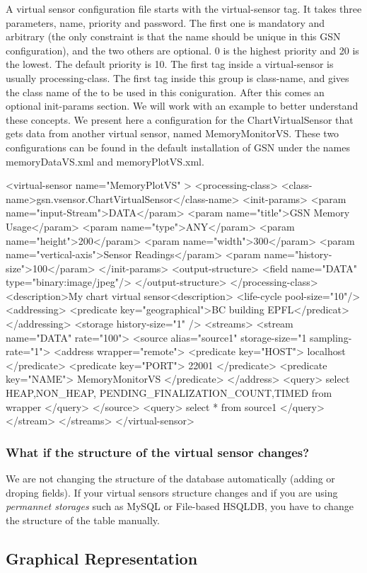 A virtual sensor configuration file starts with the virtual-sensor tag. It takes
three parameters, name, priority and password. The first one is mandatory
and arbitrary (the only constraint is that the name should be unique in this
GSN configuration), and the two others are optional. 0 is the highest priority
and 20 is the lowest. The default priority is 10.
The first tag inside a virtual-sensor is usually processing-class. The first tag
inside this group is class-name, and gives the class name of the \vsp
to be used in this coniguration. After this comes an optional init-params
section.
We will work with an example to better understand these concepts. We
present here a configuration for the ChartVirtualSensor that gets data from
another virtual sensor, named MemoryMonitorVS. These two configurations can
be found in the default installation of GSN under the names memoryDataVS.xml
and memoryPlotVS.xml.

\begin{xmlcode}[caption={\vsd Example}, label=listing:xml:vsd-example]
<virtual-sensor name="MemoryPlotVS" >
	<processing-class>
	<class-name>gsn.vsensor.ChartVirtualSensor</class-name>
		<init-params>
			<param name="input-Stream">DATA</param>
			<param name="title">GSN Memory Usage</param>
			<param name="type">ANY</param>
			<param name="height">200</param>
			<param name="width">300</param>
			<param name="vertical-axis">Sensor Readings</param>
			<param name="history-size">100</param>
		</init-params>
		<output-structure>
			<field name="DATA" type="binary:image/jpeg"/>
		</output-structure>
	</processing-class>
	<description>My chart virtual sensor<description>
	<life-cycle pool-size="10"/>
	<addressing>
		<predicate key="geographical">BC building EPFL</predicat>
	</addressing>
	<storage history-size="1" />
	<streams>
		<stream name="DATA" rate="100">
			<source alias="source1" storage-size="1 sampling-rate="1">
				<address wrapper="remote">
					<predicate key="HOST"> localhost </predicate>
					<predicate key="PORT"> 22001  </predicate>
					<predicate key="NAME">  MemoryMonitorVS  </predicate>
				</address>
				<query>
					select HEAP,NON_HEAP,
					PENDING_FINALIZATION_COUNT,TIMED
					from wrapper
				</query>
			</source>
			<query>	select * from source1 </query>
		</stream>
	</streams>
</virtual-sensor>
\end{xmlcode}

\subsubsection{What if the structure of the virtual sensor changes?}
We are not changing the structure of the database automatically (adding or droping fields). If your virtual sensors structure
changes and if you are using \emph{permannet storages} such as MySQL or File-based HSQLDB, you have to change the structure of the
table manually.\subsection{Graphical Representation}

